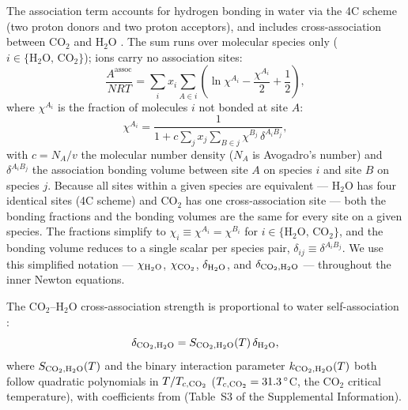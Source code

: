 \documentclass[preprint,12pt,number]{elsarticle}
\begin{document}
The association term accounts for hydrogen bonding in water via the 4C scheme (two proton
donors and two proton acceptors), and includes cross-association between CO$_2$ and H$_2$O
\citep{LiFiroozabadi2009}.
The sum runs over molecular species only ($i \in \{\mathrm{H_2O},\,\mathrm{CO_2}\}$);
ions carry no association sites:
\begin{equation}
  \frac{A^{\text{assoc}}}{NRT} = \sum_i x_i \sum_{A \in i}
    \left(\ln\chi^{A_i} - \frac{\chi^{A_i}}{2} + \frac{1}{2}\right),
  \label{eq:Aassoc}
\end{equation}
where $\chi^{A_i}$ is the fraction of molecules $i$ not bonded at site $A$:
\begin{equation}
  \chi^{A_i} = \frac{1}{1 + c \sum_j x_j \sum_{B \in j} \chi^{B_j}\,\delta^{A_iB_j}},
  \label{eq:chi}
\end{equation}
with $c = N_A/v$ the molecular number density ($N_A$ is Avogadro's number) and $\delta^{A_iB_j}$ the association bonding volume between site $A$ on species
$i$ and site $B$ on species $j$.
Because all sites within a given species are equivalent — H$_2$O has four identical sites (4C scheme) and CO$_2$ has one cross-association site — both the bonding fractions and the bonding volumes are the same for every site on a given species.
The fractions simplify to $\chi_i \equiv \chi^{A_i} = \chi^{B_i}$ for $i \in \{\mathrm{H_2O},\,\mathrm{CO_2}\}$, and the bonding volume reduces to a single scalar per species pair, $\delta_{ij} \equiv \delta^{A_iB_j}$.
We use this simplified notation — $\chi_{\rm H_2O}$, $\chi_{\rm CO_2}$, $\delta_{\rm H_2O}$, and $\delta_{{\rm CO_2},{\rm H_2O}}$ — throughout the inner Newton equations.

The CO$_2$--H$_2$O cross-association strength is proportional to water self-association
\citep{Coelho2025}:
\begin{equation}
  \delta_{{\rm CO_2},{\rm H_2O}} = S_{{\rm CO_2},{\rm H_2O}}(T)\,\delta_{\rm H_2O},
  \label{eq:Scw}
\end{equation}
where $S_{{\rm CO_2},{\rm H_2O}}(T)$ and the binary interaction parameter $k_{{\rm CO_2},{\rm H_2O}}(T)$ both follow quadratic
polynomials in $T/T_{c,{\rm CO_2}}$ ($T_{c,{\rm CO_2}} = 31.3\,^\circ$C, the CO$_2$ critical temperature), with
coefficients from \citet{Coelho2025} (Table~S3 of the Supplemental Information).
\end{document}
